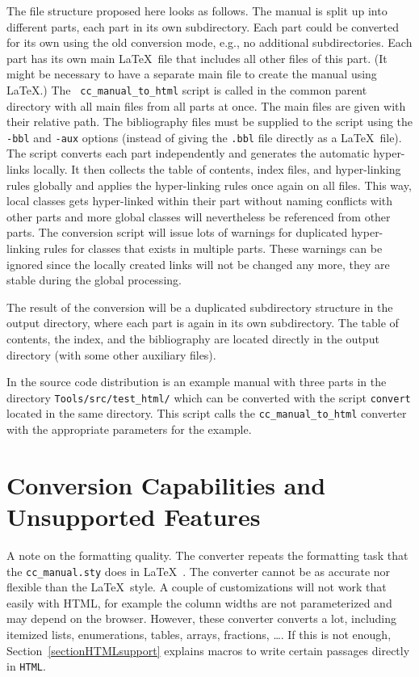 \documentclass[11pt]{article}
\begin{document}
The file structure proposed here looks as follows. The manual is split
up into different parts, each part in its own subdirectory. Each part
could be converted for its own using the old conversion mode, e.g., no
additional subdirectories. Each part has its own main \LaTeX\ file
that includes all other files of this part. (It might be necessary to
have a separate main file to create the manual using \LaTeX.) The {\tt
  cc\_manual\_to\_html} script is called in the common parent
directory with all main files from all parts at once. The main files
are given with their relative path. The bibliography files must be
supplied to the script using the {\tt -bbl} and {\tt -aux} options
(instead of giving the {\tt *.bbl} file directly as a \LaTeX\ file).
The script converts each part independently and generates the
automatic hyper-links locally. It then collects the table of contents,
index files, and hyper-linking rules globally and applies the
hyper-linking rules once again on all files. This way, local classes
gets hyper-linked within their part without naming conflicts with other
parts and more global classes will nevertheless be referenced from
other parts. The conversion script will issue lots of warnings for
duplicated hyper-linking rules for classes that exists in multiple
parts. These warnings can be ignored since the locally created links
will not be changed any more, they are stable during the global
processing.

The result of the conversion will be a duplicated subdirectory
structure in the output directory, where each part is again in its own
subdirectory. The table of contents, the index, and the bibliography
are located directly in the output directory (with some other
auxiliary files).

In the source code distribution is an example manual with three parts
in the directory {\tt Tools/src/test\_html/} which can be converted
with the script {\tt convert} located in the same directory. This
script calls the {\tt cc\_manual\_to\_html} converter with the
appropriate parameters for the example.



\section{Conversion Capabilities and Unsupported Features}

A note on the formatting quality. The converter repeats the formatting
task that the {\tt cc\_manual.sty} does in \LaTeX~\cite{k-clswr-99}.
The converter cannot be as accurate nor flexible than the \LaTeX\ 
style. A couple of customizations will not work that easily with HTML,
for example the column widths are not parameterized and may depend on
the browser.  However, these converter converts a lot, including
itemized lists, enumerations, tables, arrays, fractions, \ldots.  If
this is not enough, Section~\ref{sectionHTMLsupport} explains macros
to write certain passages directly in {\tt HTML}.
\end{document}
